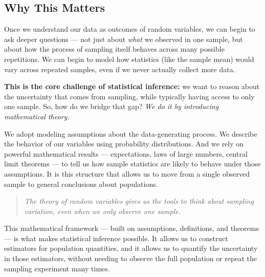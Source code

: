 \documentclass[12pt]{article}
\begin{document}
\subsection*{Why This Matters}

Once we understand our data as outcomes of random variables, we can begin to ask deeper questions — not just about \textit{what} we observed in one sample, but about how the process of sampling itself behaves across many possible repetitions. We can begin to model how statistics (like the sample mean) would vary across repeated samples, even if we never actually collect more data.

\textbf{This is the core challenge of statistical inference:} we want to reason about the uncertainty that comes from sampling, while typically having access to only one sample. So, how do we bridge that gap? \textit{We do it by introducing mathematical theory.}

We adopt modeling assumptions about the data-generating process. We describe the behavior of our variables using probability distributions. And we rely on powerful mathematical results — expectations, laws of large numbers, central limit theorems — to tell us how sample statistics are likely to behave under those assumptions. It is this structure that allows us to move from a single observed sample to general conclusions about populations.

\begin{quote}
    \textit{The theory of random variables gives us the tools to think about sampling variation, even when we only observe one sample.}
\end{quote}

This mathematical framework — built on assumptions, definitions, and theorems — is what makes statistical inference possible. It allows us to construct estimators for population quantities, and it allows us to quantify the uncertainty in those estimators, without needing to observe the full population or repeat the sampling experiment many times.
\end{document}
